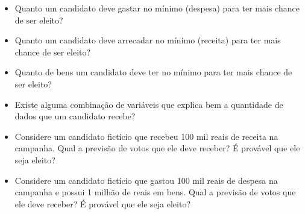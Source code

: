 \documentclass[]{article}
\providecommand{\tightlist}{%
  \setlength{\itemsep}{0pt}\setlength{\parskip}{0pt}}
\begin{document}
\begin{itemize}
\tightlist
\item
  Quanto um candidato deve gastar no mínimo (despesa) para ter mais
  chance de ser eleito?
\item
  Quanto um candidato deve arrecadar no mínimo (receita) para ter mais
  chance de ser eleito?
\item
  Quanto de bens um candidato deve ter no mínimo para ter mais chance de
  ser eleito?
\item
  Existe alguma combinação de variáveis que explica bem a quantidade de
  dados que um candidato recebe?
\item
  Considere um candidato fictício que recebeu 100 mil reais de receita
  na campanha. Qual a previsão de votos que ele deve receber? É provável
  que ele seja eleito?
\item
  Considere um candidato fictício que gastou 100 mil reais de despesa na
  campanha e possui 1 milhão de reais em bens. Qual a previsão de votos
  que ele deve receber? É provável que ele seja eleito?
\end{itemize}
\end{document}
